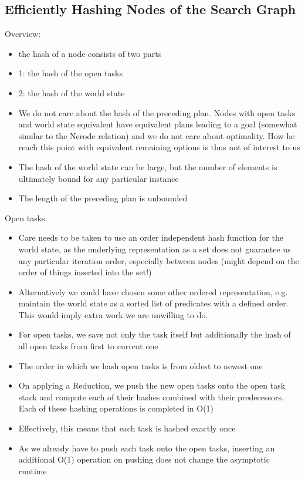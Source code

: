 \subsection{Efficiently Hashing Nodes of the Search Graph}
Overview:
\begin{itemize}
	\item the hash of a node consists of two parts
	\item 1: the hash of the open tasks
	\item 2: the hash of the world state
	\item We do not care about the hash of the preceding plan. Nodes with open tasks and world state equivalent have equivalent plans leading to a goal (somewhat similar to the Nerode relation) and we do not care about optimality. How he reach this point with equivalent remaining options is thus not of interest to us
	\item The hash of the world state can be large, but the number of elements is ultimately bound for any particular instance
	\item The length of the preceding plan is unbounded
\end{itemize}
Open tasks:
\begin{itemize}
	\item Care needs to be taken to use an order independent hash function for the world state, as the underlying representation as a set does not guarantee us any particular iteration order, especially between nodes (might depend on the order of things inserted into the set!)
	\item Alternatively we could have chosen some other ordered representation, e.g. maintain the world state as a sorted list of predicates with a defined order. This would imply extra work we are unwilling to do.
	\item For open tasks, we save not only the task itself but additionally the hash of all open tasks from first to current one
	\item The order in which we hash open tasks is from oldest to newest one
	\item On applying a Reduction, we push the new open tasks onto the open task stack and compute each of their hashes combined with their predecessors. Each of these hashing operations is completed in O(1)
	\item Effectively, this means that each task is hashed exactly once
	\item As we already have to push each task onto the open tasks, inserting an additional O(1) operation on pushing does not change the asymptotic runtime
\end{itemize}

